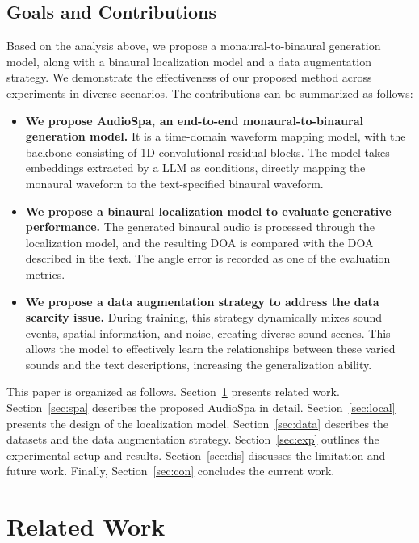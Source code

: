 \documentclass{IEEEtran}
\begin{document}
\subsection{Goals and Contributions}
Based on the analysis above, we propose a monaural-to-binaural generation model, along with a binaural localization model and a data augmentation strategy. We demonstrate the effectiveness of our proposed method across experiments in diverse scenarios. The contributions can be summarized as follows:
\begin{itemize}
    \item
    \textbf{We propose AudioSpa, an end-to-end monaural-to-binaural generation model.} It is a time-domain waveform mapping model, with the backbone consisting of 1D convolutional residual blocks. The model takes embeddings extracted by a LLM as conditions, directly mapping the monaural waveform to the text-specified binaural waveform.

    \item
    \textbf{We propose a binaural localization model to evaluate generative performance.} The generated binaural audio is processed through the localization model, and the resulting DOA is compared with the DOA described in the text. The angle error is recorded as one of the evaluation metrics.

    \item
    \textbf{We propose a data augmentation strategy to address the data scarcity issue.} During training, this strategy dynamically mixes sound events, spatial information, and noise, creating diverse sound scenes. This allows the model to effectively learn the relationships between these varied sounds and the text descriptions, increasing the generalization ability.
\end{itemize}

This paper is organized as follows. Section~\ref{sec:re} presents related work. Section~\ref{sec:spa} describes the proposed AudioSpa in detail. Section~\ref{sec:local} presents the design of the localization model. Section~\ref{sec:data} describes the datasets and the data augmentation strategy. Section~\ref{sec:exp} outlines the experimental setup and results. Section~\ref{sec:dis} discusses the limitation and future work. Finally, Section~\ref{sec:con} concludes the current work.


\section{Related Work}   \label{sec:re}
\end{document}
